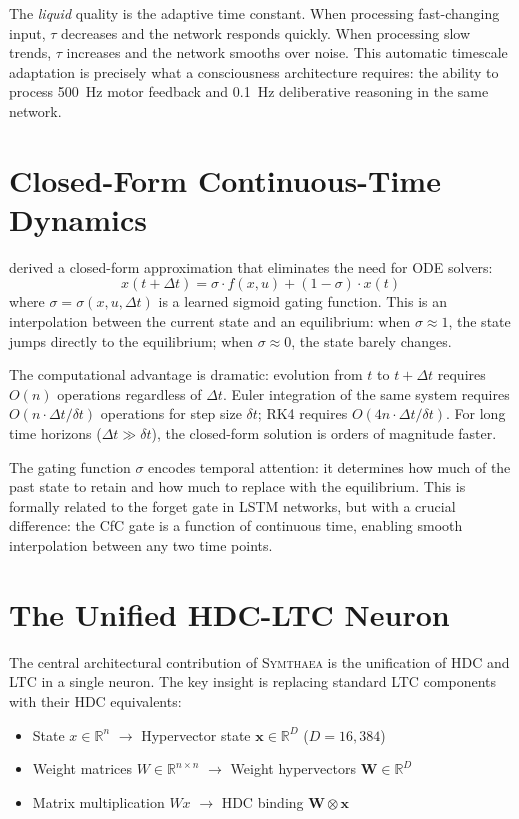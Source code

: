 \documentclass[12pt]{book}
\newcommand{\bind}{\otimes}
\newcommand{\hvx}{\mathbf{x}}
\newcommand{\hvw}{\mathbf{W}}
\newcommand{\symthaea}{\textsc{Symthaea}}
\newcommand{\R}{\mathbb{R}}
\begin{document}
The \textit{liquid} quality is the adaptive time constant. When processing fast-changing input, $\tau$ decreases and the network responds quickly. When processing slow trends, $\tau$ increases and the network smooths over noise. This automatic timescale adaptation is precisely what a consciousness architecture requires: the ability to process 500~Hz motor feedback and 0.1~Hz deliberative reasoning in the same network.

\section{Closed-Form Continuous-Time Dynamics}

\citet{hasani2022closed} derived a closed-form approximation that eliminates the need for ODE solvers:
\begin{equation}\label{eq:cfc}
x(t + \Delta t) = \sigma \cdot f(x, u) + (1 - \sigma) \cdot x(t)
\end{equation}
where $\sigma = \sigma(x, u, \Delta t)$ is a learned sigmoid gating function. This is an interpolation between the current state and an equilibrium: when $\sigma \approx 1$, the state jumps directly to the equilibrium; when $\sigma \approx 0$, the state barely changes.

The computational advantage is dramatic: evolution from $t$ to $t + \Delta t$ requires $O(n)$ operations regardless of $\Delta t$. Euler integration of the same system requires $O(n \cdot \Delta t / \delta t)$ operations for step size $\delta t$; RK4 requires $O(4n \cdot \Delta t / \delta t)$. For long time horizons ($\Delta t \gg \delta t$), the closed-form solution is orders of magnitude faster.

The gating function $\sigma$ encodes temporal attention: it determines how much of the past state to retain and how much to replace with the equilibrium. This is formally related to the forget gate in LSTM networks, but with a crucial difference: the CfC gate is a function of continuous time, enabling smooth interpolation between any two time points.

\section{The Unified HDC-LTC Neuron}

The central architectural contribution of \symthaea{} is the unification of HDC and LTC in a single neuron. The key insight is replacing standard LTC components with their HDC equivalents:
\begin{itemize}
  \item State $x \in \R^n$ $\to$ Hypervector state $\hvx \in \R^D$ ($D = 16{,}384$)
  \item Weight matrices $W \in \R^{n \times n}$ $\to$ Weight hypervectors $\hvw \in \R^D$
  \item Matrix multiplication $Wx$ $\to$ HDC binding $\hvw \bind \hvx$
\end{itemize}
\end{document}
